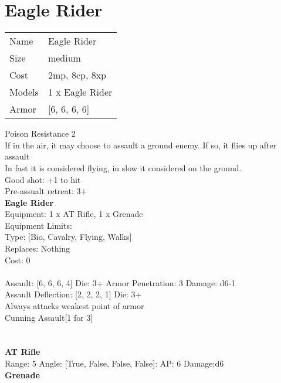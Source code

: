 \pagebreak\pagebreak

\section{ Eagle Rider }

\begin{tabular}{ll}
  Name & Eagle Rider \\
  Size & medium\\
  Cost & 2mp, 8cp, 8xp\\
  Models & 1 x Eagle Rider\\
  Armor & [6, 6, 6, 6]\\
\end{tabular}

\noindent Poison Resistance 2\\ 
If in the air, it may choose to assault a ground enemy. If so, it flies up after assault\\ 
In fast it is considered flying, in slow it considered on the ground.\\ 
Good shot: +1 to hit\\ 
Pre-assualt retreat: 3+\\ 


{\bf Eagle Rider } \\
Equipment: 1 x AT Rifle, 1 x Grenade \\
Equipment Limits:  \\
Type: [Bio, Cavalry, Flying, Walks] \\
Replaces: Nothing \\
Cost: 0\\
\ \\
Assault: [6, 6, 6, 4] Die: 3+ Armor Penetration: 3 Damage: d6-1 \\
Assault Deflection: [2, 2, 2, 1] Die: 3+\\
\indent Always attacks weakest point of armor\\ 
Cunning Assault[1 for 3]\\ 
 
\ \\

\ \\
{\bf AT Rifle } \\



Range: 5  Angle: [True, False, False, False]: AP: 6 Damage:d6 \\




{\bf Grenade } \\



